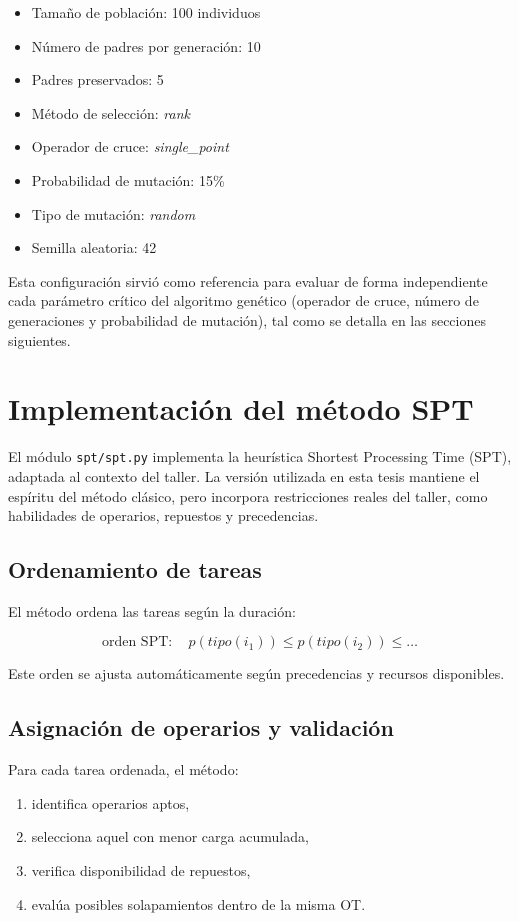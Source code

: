 \begin{itemize}
    \item Tamaño de población: 100 individuos
    \item Número de padres por generación: 10
    \item Padres preservados: 5
    \item Método de selección: \textit{rank}
    \item Operador de cruce: \textit{single\_point}
    \item Probabilidad de mutación: 15\%
    \item Tipo de mutación: \textit{random}
    \item Semilla aleatoria: 42
\end{itemize}

Esta configuración sirvió como referencia para evaluar de forma independiente cada parámetro crítico del algoritmo genético (operador de cruce, número de generaciones y probabilidad de mutación), tal como se detalla en las secciones siguientes.

\section{Implementación del método SPT}

El módulo \texttt{spt/spt.py} implementa la heurística Shortest Processing Time (SPT), adaptada al contexto del taller. La versión utilizada en esta tesis mantiene el espíritu del método clásico, pero incorpora restricciones reales del taller, como habilidades de operarios, repuestos y precedencias.

\subsection{Ordenamiento de tareas}

El método ordena las tareas según la duración:

\[
\text{orden SPT}: \quad p(tipo(i_1)) \le p(tipo(i_2)) \le \dots
\]

Este orden se ajusta automáticamente según precedencias y recursos disponibles.

\subsection{Asignación de operarios y validación}

Para cada tarea ordenada, el método:

\begin{enumerate}
    \item identifica operarios aptos,
    \item selecciona aquel con menor carga acumulada,
    \item verifica disponibilidad de repuestos,
    \item evalúa posibles solapamientos dentro de la misma OT.
\end{enumerate}

